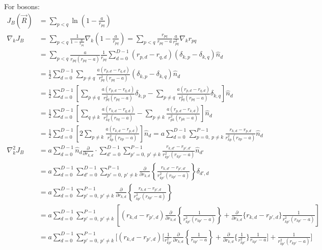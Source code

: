 \documentclass[12pt]{article}
\begin{document}
\noindent For bosons:
\begin{align*}
J_B(\vec{R}) &= \sum_{p<q} \ln \left( 1-\frac{a}{r_{pq}} \right)\\
\nabla_k  J_B  &= \sum_{p<q} \frac{1}{1-\frac{a}{r_{pq}}} \nabla_{k} \left( 1-\frac{a}{r_{pq}} \right) 
= \sum_{p<q} \frac{r_{pq}}{r_{pq}-a} \frac{a}{r_{pq}^2} \nabla_k r_{pq} \\
&= \sum_{p<q} \frac{a}{r_{pq}(r_{pq}-a)} \frac{1}{r_{pq}} \sum_{d=0}^{D-1} (r_{p,d}-r_{q,d}) (\delta_{k,p}-\delta_{k,q}) \hat{n}_{d} \\
&=\frac{1}{2} \sum_{d=0}^{D-1} \sum_{p\neq q} \frac{a (r_{p,d}-r_{q,d})}{r_{pq}^2(r_{pq}-a)} (\delta_{k,p}-\delta_{k,q}) \hat{n}_{d} \\
&=\frac{1}{2} \sum_{d=0}^{D-1} \left[  \sum_{p\neq q} \frac{a (r_{p,d}-r_{q,d})}{r_{pq}^2(r_{pq}-a)} \delta_{k,p} - \sum_{p\neq q} \frac{a (r_{p,d}-r_{q,d})}{r_{pq}^2(r_{pq}-a)} \delta_{k,q} \right] \hat{n}_{d} \\
&=\frac{1}{2} \sum_{d=0}^{D-1} \left[  \sum_{q\neq k} \frac{a (r_{k,d}-r_{q,d})}{r_{kq}^2(r_{kq}-a)}  - \sum_{p\neq k} \frac{a (r_{p,d}-r_{k,d})}{r_{pk}^2(r_{pk}-a)} \right] \hat{n}_{d} \\
&=\frac{1}{2} \sum_{d=0}^{D-1} \left[ 2  \sum_{p\neq k} \frac{a (r_{k,d}-r_{p,d})}{r_{kp}^2(r_{kp}-a)} \right] \hat{n}_{d} =  a \sum_{d=0}^{D-1}  \sum_{p=0, \ p\neq k}^{P-1} \frac{r_{k,d}-r_{p,d}}{r_{kp}^2(r_{kp}-a)}  \hat{n}_{d} \\
\nabla_k^2 J_B &= a \sum_{d=0}^{D-1} \hat{n}_d \frac{\partial}{\partial r_{k,d}} \cdot \sum_{d'=0}^{D-1}  \sum_{p'=0, \ p'\neq k}^{P-1} \frac{r_{k,d'}-r_{p',d'}}{r_{kp'}^2(r_{kp'}-a)}  \hat{n}_{d'} \\
&= a \sum_{d=0}^{D-1} \sum_{d'=0}^{D-1}  \sum_{p'=0, \ p'\neq k}^{P-1} \frac{\partial}{\partial r_{k,d}} \left\{  \frac{r_{k,d'}-r_{p',d'}}{r_{kp'}^2(r_{kp'}-a)} \right\} \delta_{d',d} \\
&= a \sum_{d=0}^{D-1} \sum_{p'=0, \ p'\neq k}^{P-1} \frac{\partial}{\partial r_{k,d}} \left\{  \frac{r_{k,d}-r_{p',d}}{r_{kp'}^2(r_{kp'}-a)} \right\} \\
&= a \sum_{d=0}^{D-1} \sum_{p'=0, \ p'\neq k}^{P-1} \left[ 
(r_{k,d}-r_{p',d}) \frac{\partial}{\partial r_{k,d}} \left\{ \frac{1}{r_{kp'}^2(r_{kp'}-a)} \right\} + \frac{\partial}{\partial r_{k,d}} \big\{ r_{k,d}-r_{p',d} \big\} \frac{1}{r_{kp'}^2(r_{kp'}-a)}
\right] \\
&= a \sum_{d=0}^{D-1} \sum_{p'=0, \ p'\neq k}^{P-1} \Bigg[ 
(r_{k,d}-r_{p',d}) 
\bigg[ 
\frac{1}{r_{kp'}^2} \frac{\partial}{\partial r_{k,d}}  \left\{ \frac{1}{r_{kp'}-a} \right\}
+\frac{\partial}{\partial r_{k,d}} \bigg\{ \frac{1}{r_{kp'}^2}  \bigg\} \frac{1}{r_{kp'}-a}
\bigg]
 + \frac{1}{r_{kp'}^2(r_{kp'}-a)}
\Bigg] \\
\end{align*}
\end{document}
